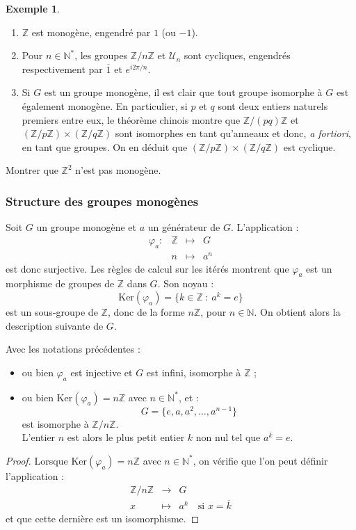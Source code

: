 \documentclass[french]{article}
\newcommand{\N}{\mathbb{N}}
\newcommand{\Z}{\mathbb{Z}}
\newcommand{\st}{^*}
\renewcommand{\ker}{\text{Ker}}
\theoremstyle{plain}
\theoremstyle{definition}
\newtheorem*{ex}{Exemple}
\theoremstyle{remark}
\begin{document}
\begin{ex}
	\begin{enumerate}
		\item $\Z$ est monogène, engendré par $1$ (ou $-1$).
		\item Pour $n\in\N\st$, les groupes $\Z/n\Z$ et $\mathcal{U}_n$ sont cycliques, engendrés respectivement par $\overline{1}$ et $e^{i2\pi/n}$.
		\item Si $G$ est un groupe monogène, il est clair que tout groupe isomorphe à $G$ est également monogène. En particulier, si $p$ et $q$ sont deux entiers naturels premiers entre eux, le théorème chinois montre que $\Z/(pq)\Z$ et $(\Z/p\Z)\times(\Z/q\Z)$ sont isomorphes en tant qu'anneaux et donc, \textit{a fortiori}, en tant que groupes. On en déduit que $(\Z/p\Z)\times(\Z/q\Z)$ est cyclique.
	\end{enumerate}
\end{ex}

\begin{exo}
	Montrer que $\Z^2$ n'est pas monogène.
\end{exo}

\subsubsection*{Structure des groupes monogènes}

Soit $G$ un groupe monogène et $a$ un générateur de $G$. L'application :
$$\begin{array}{lrcl}
	\varphi_a:&\Z&\longmapsto&G\\
	&n&\longmapsto&a^n
\end{array}$$ est donc surjective. Les règles de calcul sur les itérés montrent que $\varphi_a$ est un morphisme de groupes de $\Z$ dans $G$. Son noyau :
$$\ker(\varphi_a)=\{k\in\Z\ :\ a^k=e\}$$ est un sous-groupe de $\Z$, donc de la forme $n\Z$, pour $n\in\N$. On obtient alors la description suivante de $G$.

\begin{prop}%
	Avec les notations précédentes :
	\begin{itemize}
		\item ou bien $\varphi_a$ est injective et $G$ est infini, isomorphe à $\Z$ ;
		\item ou bien $\ker(\varphi_a)=n\Z$ avec $n\in\N\st$, et :
		$$G=\{e,a,a^2,\ldots,a^{n-1}\}$$ est isomorphe à $\Z/n\Z$.\\
		L'entier $n$ est alors le plus petit entier $k$ non nul tel que $a^k=e$.
	\end{itemize}
\end{prop}
\begin{proof}
	Lorsque $\ker(\varphi_a)=n\Z$ avec $n\in\N\st$, on vérifie que l'on peut définir l'application :
	$$\begin{array}{rcl}
		\Z/n\Z&\longrightarrow&G\\
		x&\longmapsto&a^k\quad\text{si }x=\overline{k}
	\end{array}$$ et que cette dernière est un isomorphisme.
\end{proof}
\end{document}
